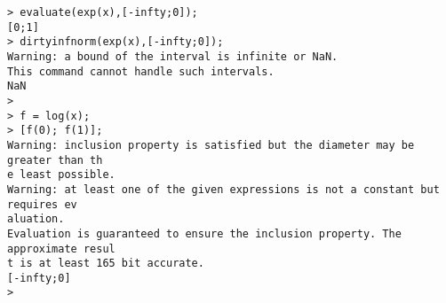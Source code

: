 \begin{center}\begin{minipage}{15cm}\begin{Verbatim}[frame=single]
> evaluate(exp(x),[-infty;0]);
[0;1]
> dirtyinfnorm(exp(x),[-infty;0]);
Warning: a bound of the interval is infinite or NaN.
This command cannot handle such intervals.
NaN
> 
> f = log(x);
> [f(0); f(1)];
Warning: inclusion property is satisfied but the diameter may be greater than th
e least possible.
Warning: at least one of the given expressions is not a constant but requires ev
aluation.
Evaluation is guaranteed to ensure the inclusion property. The approximate resul
t is at least 165 bit accurate.
[-infty;0]
> 
\end{Verbatim}
\end{minipage}\end{center}
